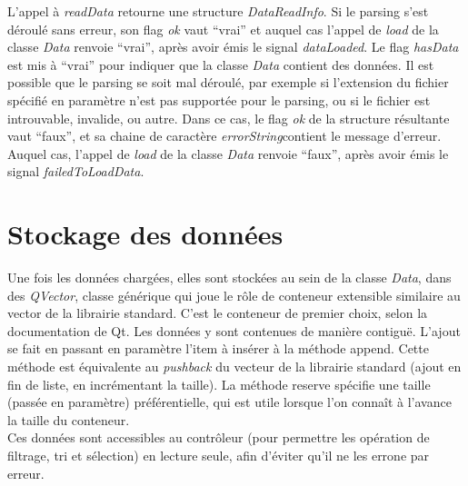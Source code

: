\documentclass[12pt]{article}
\begin{document}
		L’appel à \textit{readData} retourne une structure \textit{DataReadInfo}. Si le parsing s’est déroulé sans erreur, son flag \textit{ok} vaut “vrai” et auquel cas l’appel de \textit{load} de la classe \textit{Data} renvoie “vrai”, après avoir émis le signal \textit{dataLoaded}. Le flag \textit{hasData} est mis à “vrai” pour indiquer que la classe \textit{Data} contient des données. Il est possible que le parsing se soit mal déroulé, par exemple si l’extension du fichier spécifié en paramètre n’est pas supportée pour le parsing, ou si le fichier est introuvable, invalide, ou autre. Dans ce cas, le flag \textit{ok} de la structure résultante vaut “faux”, et sa chaine de caractère \textit{errorString}contient le message d’erreur. Auquel cas, l’appel de \textit{load} de la classe \textit{Data} renvoie “faux”, après avoir émis le signal \textit{failedToLoadData}.
	
	\section{Stockage des données}
	Une fois les données chargées, elles sont stockées au sein de la classe \textit{Data}, dans des \textit{QVector}, classe générique qui joue le rôle de conteneur extensible similaire au vector de la librairie standard. C’est le conteneur de premier choix, selon la documentation de Qt.
Les données y sont contenues de manière contiguë. L’ajout se fait en passant en paramètre l’item à insérer à la méthode append. Cette méthode est équivalente au \textit{pushback} du vecteur de la librairie standard (ajout en fin de liste, en incrémentant la taille). La méthode reserve spécifie une taille (passée en paramètre) préférentielle, qui est utile lorsque l’on connaît à l’avance la taille du conteneur.\\

	Ces données sont accessibles au contrôleur (pour permettre les opération de filtrage, tri et sélection) en lecture seule, afin d’éviter qu’il ne les errone par erreur.\\
\end{document}
